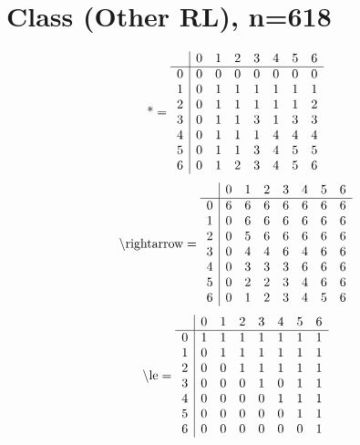 \documentclass[11pt]{article}
\begin{document}
\section{Class (Other RL), n=618}
\[\text{*} = 
\begin{array}{r | r r r r r r r}
 & 0 & 1 & 2 & 3 & 4 & 5 & 6 \\ \hline
0 & 0 & 0 & 0 & 0 & 0 & 0 & 0 \\
1 & 0 & 1 & 1 & 1 & 1 & 1 & 1 \\
2 & 0 & 1 & 1 & 1 & 1 & 1 & 2 \\
3 & 0 & 1 & 1 & 3 & 1 & 3 & 3 \\
4 & 0 & 1 & 1 & 1 & 4 & 4 & 4 \\
5 & 0 & 1 & 1 & 3 & 4 & 5 & 5 \\
6 & 0 & 1 & 2 & 3 & 4 & 5 & 6 \\
\end{array}
\]
\[\text{\textbackslash rightarrow} = 
\begin{array}{r | r r r r r r r}
 & 0 & 1 & 2 & 3 & 4 & 5 & 6 \\ \hline
0 & 6 & 6 & 6 & 6 & 6 & 6 & 6 \\
1 & 0 & 6 & 6 & 6 & 6 & 6 & 6 \\
2 & 0 & 5 & 6 & 6 & 6 & 6 & 6 \\
3 & 0 & 4 & 4 & 6 & 4 & 6 & 6 \\
4 & 0 & 3 & 3 & 3 & 6 & 6 & 6 \\
5 & 0 & 2 & 2 & 3 & 4 & 6 & 6 \\
6 & 0 & 1 & 2 & 3 & 4 & 5 & 6 \\
\end{array}
\]
\[\text{\textbackslash le} = 
\begin{array}{r | r r r r r r r}
 & 0 & 1 & 2 & 3 & 4 & 5 & 6 \\ \hline
0 & 1 & 1 & 1 & 1 & 1 & 1 & 1 \\
1 & 0 & 1 & 1 & 1 & 1 & 1 & 1 \\
2 & 0 & 0 & 1 & 1 & 1 & 1 & 1 \\
3 & 0 & 0 & 0 & 1 & 0 & 1 & 1 \\
4 & 0 & 0 & 0 & 0 & 1 & 1 & 1 \\
5 & 0 & 0 & 0 & 0 & 0 & 1 & 1 \\
6 & 0 & 0 & 0 & 0 & 0 & 0 & 1 \\
\end{array}
\]
\end{document}
